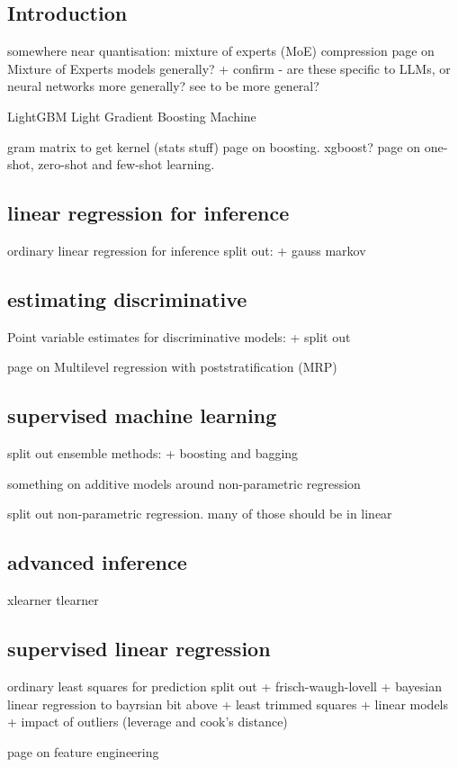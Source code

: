 
\subsection{Introduction}

somewhere near quantisation: mixture of experts (MoE) compression
page on Mixture of Experts models generally?
+ confirm - are these specific to LLMs, or neural networks more generally? see to be more general?

LightGBM
	Light Gradient Boosting Machine

gram matrix to get kernel (stats stuff)
page on boosting. xgboost?
page on one-shot, zero-shot and few-shot learning.


\subsection{linear regression for inference}

ordinary linear regression for inference split out:
+ gauss markov

\subsection{estimating discriminative}

Point variable estimates for discriminative models:
+ split out

page on Multilevel regression with poststratification (MRP)

\subsection{supervised machine learning}

split out ensemble methods:
+ boosting and bagging

something on additive models around non-parametric regression

split out non-parametric regression. many of those should be in linear

\subsection{advanced inference}

xlearner
tlearner

\subsection{supervised linear regression}

ordinary least squares for prediction split out
+ frisch-waugh-lovell
+ bayesian linear regression to bayrsian bit above
+ least trimmed squares
+ linear models
+ impact of outliers (leverage and cook's distance)

page on feature engineering



